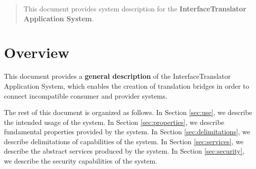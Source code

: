 \documentclass[a4paper]{arrowhead}
\begin{document}
\ArrowheadDate{\today}
\ArrowheadSetup

\begin{center}
  \vspace*{1cm}
  \huge{\arrowtitle}

  \vspace*{0.2cm}
  \LARGE{\arrowtype}
  \vspace*{1cm}

  \vspace*{\fill}


  \vspace*{1cm}
  \vspace*{\fill}

  \begin{abstract}
    This document provides system description for the \textbf{InterfaceTranslator Application System}.
  \end{abstract}

  \vspace*{1cm}

 \end{center}

\newpage

\tableofcontents
\newpage

\section{Overview}
\label{sec:overview}
\color{black}
This document provides a \textbf{general description} of the InterfaceTranslator Application System, which enables the creation of translation bridges in order to connect incompatible consumer and provider systems.

The rest of this document is organized as follows.
In Section \ref{sec:use}, we describe the intended usage of the system.
In Section \ref{sec:properties}, we describe fundamental properties
provided by the system.
In Section \ref{sec:delimitations}, we describe delimitations of capabilities
of the system.
In Section \ref{sec:services}, we describe the abstract services produced by the system.
In Section \ref{sec:security}, we describe the security capabilities
of the system.
\end{document}
